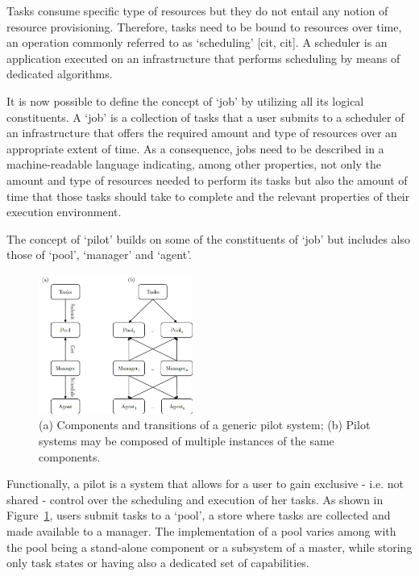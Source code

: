 \documentclass{sig-alternate}
\begin{document}

Tasks consume specific type of resources but they do not entail any
notion of resource provisioning. Therefore, tasks need to be bound to
resources over time, an operation commonly referred to as `scheduling'
[cit, cit]. A scheduler is an application executed on an infrastructure
that performs scheduling by means of dedicated algorithms.


It is now possible to define the concept of `job' by utilizing all its
logical constituents. A `job' is a collection of tasks that a user
submits to a scheduler of an infrastructure that offers the required
amount and type of resources over an appropriate extent of time. As a
consequence, jobs need to be described in  a machine-readable language
indicating, among other properties, not only the amount and type of
resources needed to perform its tasks but also the amount of time that
those tasks should take to complete and the relevant properties of their
execution environment.


The concept of `pilot' builds on some of the constituents of `job'
but includes also those of `pool', `manager' and `agent'. 


\begin{figure} [t]
	\centering
	\includegraphics[width=0.45\textwidth]{figures/pilot_section3_1}
	\caption{(a) Components and transitions of a generic pilot
		system; (b) Pilot systems may be composed of multiple
	instances of the same components.}
	\label{fig:s3_pilot_diagram}
\end{figure}


Functionally, a pilot is a system that allows for a user to gain
exclusive - i.e. not shared - control over the scheduling and execution
of her tasks. As shown in Figure~\ref{fig:s3_pilot_diagram}, users submit
tasks to a `pool', a store where tasks are collected and made
available to a manager. The implementation of a pool varies among
\pilotjobs with the pool being a stand-alone component or a subsystem of
a master, while storing only task states or having also a dedicated set
of capabilities.
\end{document}
